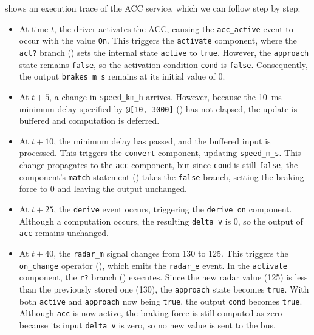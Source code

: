  shows an execution trace of the ACC service, which we can
follow step by step:
\begin{itemize}
  \item At time $t$, the driver activates the ACC, causing the \texttt{acc\_active} event to
        occur with the value \texttt{On}. This triggers the \texttt{activate} component, where
        the \texttt{act?} branch () sets the internal state
        \texttt{active} to \texttt{true}. However, the \texttt{approach} state remains
        \texttt{false}, so the activation condition \texttt{cond} is \texttt{false}.
        Consequently, the output \texttt{brakes\_m\_s} remains at its initial value of 0.

  \item At $t+5$, a change in \texttt{speed\_km\_h} arrives. However, because the 10~ms minimum
        delay specified by \texttt{@[10, 3000]} ()
        has not elapsed, the update is buffered and computation is deferred.

  \item At $t+10$, the minimum delay has passed, and the buffered input is processed. This
        triggers the \texttt{convert} component, updating \texttt{speed\_m\_s}. This change
        propagates to the \texttt{acc} component, but since \texttt{cond} is still
        \texttt{false}, the component's \texttt{match} statement
        () takes the \texttt{false} branch, setting the
        braking force to 0 and leaving the output unchanged.

  \item At $t+25$, the \texttt{derive} event occurs, triggering the \texttt{derive\_on}
        component. Although a computation occurs, the resulting \texttt{delta\_v} is 0, so the
        output of \texttt{acc} remains unchanged.

  \item At $t+40$, the \texttt{radar\_m} signal changes from 130 to 125. This triggers the
        \texttt{on\_change} operator (), which emits the
        \texttt{radar\_e} event. In the \texttt{activate} component, the \texttt{r?} branch
        () executes. Since the new radar value (125) is
        less than the previously stored one (130), the \texttt{approach} state becomes
        \texttt{true}. With both \texttt{active} and \texttt{approach} now being \texttt{true},
        the output \texttt{cond} becomes \texttt{true}. Although \texttt{acc} is now active,
        the braking force is still computed as zero because its input \texttt{delta\_v} is
        zero, so no new value is sent to the bus.


\end{itemize}

